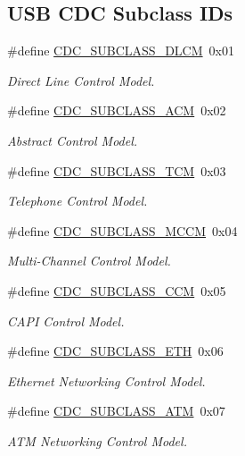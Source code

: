 \subsection*{\-U\-S\-B \-C\-D\-C \-Subclass \-I\-Ds}
\begin{DoxyCompactItemize}
\item 
\#define \hyperlink{group__cdc__protocol__group_ga9d555a2c20cdda9166df1f1a0deb2fe6}{\-C\-D\-C\-\_\-\-S\-U\-B\-C\-L\-A\-S\-S\-\_\-\-D\-L\-C\-M}~0x01
\begin{DoxyCompactList}\small\item\em \-Direct \-Line \-Control \-Model. \end{DoxyCompactList}\item 
\#define \hyperlink{group__cdc__protocol__group_gacce3aedc4473cc5526efc16448b89221}{\-C\-D\-C\-\_\-\-S\-U\-B\-C\-L\-A\-S\-S\-\_\-\-A\-C\-M}~0x02
\begin{DoxyCompactList}\small\item\em \-Abstract \-Control \-Model. \end{DoxyCompactList}\item 
\#define \hyperlink{group__cdc__protocol__group_ga8e66107828e9b10a8b37823cb4436209}{\-C\-D\-C\-\_\-\-S\-U\-B\-C\-L\-A\-S\-S\-\_\-\-T\-C\-M}~0x03
\begin{DoxyCompactList}\small\item\em \-Telephone \-Control \-Model. \end{DoxyCompactList}\item 
\#define \hyperlink{group__cdc__protocol__group_ga279c0e93e9cf1c328e9551e62ebdc342}{\-C\-D\-C\-\_\-\-S\-U\-B\-C\-L\-A\-S\-S\-\_\-\-M\-C\-C\-M}~0x04
\begin{DoxyCompactList}\small\item\em \-Multi-\/\-Channel \-Control \-Model. \end{DoxyCompactList}\item 
\#define \hyperlink{group__cdc__protocol__group_gac03be4247341651b8a14fa4c57955bca}{\-C\-D\-C\-\_\-\-S\-U\-B\-C\-L\-A\-S\-S\-\_\-\-C\-C\-M}~0x05
\begin{DoxyCompactList}\small\item\em \-C\-A\-P\-I \-Control \-Model. \end{DoxyCompactList}\item 
\#define \hyperlink{group__cdc__protocol__group_gaa5ab06b184069e6a8692c6e82b2595b3}{\-C\-D\-C\-\_\-\-S\-U\-B\-C\-L\-A\-S\-S\-\_\-\-E\-T\-H}~0x06
\begin{DoxyCompactList}\small\item\em \-Ethernet \-Networking \-Control \-Model. \end{DoxyCompactList}\item 
\#define \hyperlink{group__cdc__protocol__group_gaf1a7d3d1e1dd78003500d6fccd205461}{\-C\-D\-C\-\_\-\-S\-U\-B\-C\-L\-A\-S\-S\-\_\-\-A\-T\-M}~0x07
\begin{DoxyCompactList}\small\item\em \-A\-T\-M \-Networking \-Control \-Model. \end{DoxyCompactList}\end{DoxyCompactItemize}
